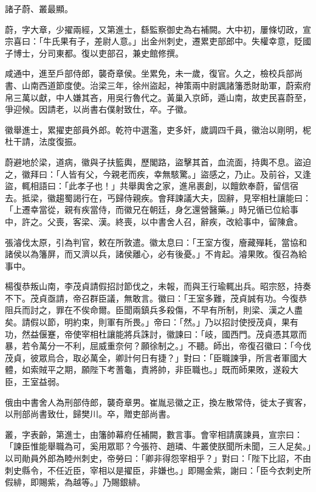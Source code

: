\begin{pinyinscope}
 諸子蔚、叢最顯。



 蔚，字大章，少擢兩經，又第進士，繇監察御史為右補闕。大中初，屢條切政，宣宗喜曰：「牛氏果有子，差尉人意。」出金州刺史，遷累吏部郎中。失權幸意，貶國子博士，分司東都。復以吏部召，兼史館修撰。



 咸通中，進至戶部侍郎，襲奇章侯。坐累免，未一歲，復官。久之，檢校兵部尚書、山南西道節度使。治梁三年，徐州盜起，神策兩中尉諷諸籓悉財助軍，蔚索府帛三萬以獻，中人嫌其吝，用吳行魯代之。黃巢入京師，遁山南，故吏民喜蔚至，爭迎候。因請老，以尚書右僕射致仕，卒。子徽。



 徽舉進士，累擢吏部員外郎。乾符中選濫，吏多奸，歲調四千員，徽治以剛明，柅杜干請，法度復振。



 蔚避地於梁，道病，徽與子扶籃輿，歷閣路，盜擊其首，血流面，持輿不息。盜迫之，徽拜曰：「人皆有父，今親老而疾，幸無駭驚。」盜感之，乃止。及前谷，又逢盜，輒相語曰：「此孝子也！」共舉輿舍之家，進帛裹創，以饘飲奉蔚，留信宿去。抵梁，徽趨蜀謁行在，丐歸侍親疾。會拜諫議大夫，固辭，見宰相杜讓能曰：「上遷幸當從，親有疾當侍，而徽兄在朝廷，身乞還營醫藥。」時兄循已位給事中，許之。父喪，客梁、漢。終喪，以中書舍人召，辭疾，改給事中，留陳倉。



 張濬伐太原，引為判官，敕在所敦遣。徽太息曰：「王室方復，廥藏殫耗，當協和諸侯以為籓屏，而又濟以兵，諸侯離心，必有後憂。」不肯起。濬果敗。復召為給事中。



 楊復恭叛山南，李茂貞請假招討節伐之，未報，而與王行瑜輒出兵。昭宗怒，持奏不下。茂貞亟請，帝召群臣議，無敢言。徽曰：「王室多難，茂貞誠有功。今復恭阻兵而討之，罪在不俟命爾。臣聞兩鎮兵多殺傷，不早有所制，則梁、漢之人盡矣。請假以節，明約束，則軍有所畏。」帝曰：「然。」乃以招討使授茂貞，果有功，然益偃蹇，帝使宰相杜讓能將兵誅討，徽諫曰：「岐，國西門。茂貞憑其眾而暴，若令萬分一不利，屈威重奈何？願徐制之。」不聽。師出，帝復召徽曰：「今伐茂貞，彼眾烏合，取必萬全，卿計何日有捷？」對曰：「臣職諫爭，所言者軍國大體，如索賊平之期，願陛下考蓍龜，責將帥，非臣職也。」既而師果敗，遂殺大臣，王室益弱。



 俄由中書舍人為刑部侍郎，襲奇章男。崔胤忌徽之正，換左散常侍，徙太子賓客，以刑部尚書致仕，歸樊川。卒，贈吏部尚書。



 叢，字表齡，第進士，由籓帥幕府任補闕，數言事。會宰相請廣諫員，宣宗曰：「諫臣惟能舉職為可，奚用眾耶？今張符、趙璘、牛叢使朕聞所未聞，三人足矣。」以司勛員外郎為睦州刺史，帝勞曰：「卿非得怨宰相乎？」對曰：「陛下比詔，不由刺史縣令，不任近臣，宰相以是擢臣，非嫌也。」即賜金紫，謝曰：「臣今衣刺史所假緋，即賜紫，為越等。」乃賜銀緋。




\end{pinyinscope}
